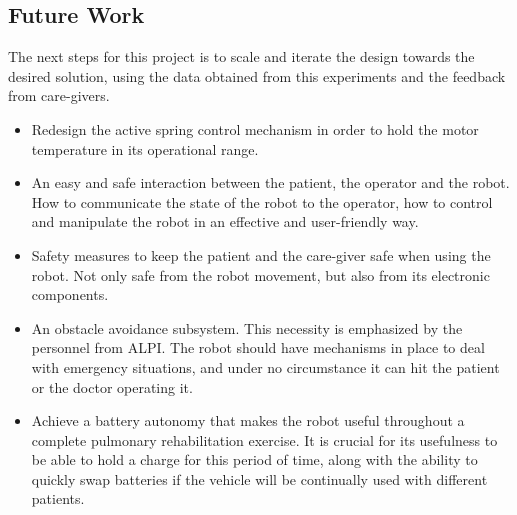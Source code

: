 \documentclass[journal]{IEEEtran}
\begin{document}
\subsection{Future Work}

The next steps for this project is to scale and iterate the design towards the desired solution, using the data obtained from this experiments and the feedback from care-givers.

\begin{itemize}
    \item Redesign the active spring control mechanism in order to hold the motor temperature in its operational range.
    \item An easy and safe interaction between the patient, the operator and the robot. How to communicate the state of the robot to the operator, how to control and manipulate the robot in an effective and user-friendly way.
    \item Safety measures to keep the patient and the care-giver safe when using the robot. Not only safe from the robot movement, but also from its electronic components.
    \item An obstacle avoidance subsystem. This necessity is emphasized by the personnel from ALPI. The robot should have mechanisms in place to deal with emergency situations, and under no circumstance it can hit the patient or the doctor operating it.
    \item Achieve a battery autonomy that makes the robot useful throughout a complete pulmonary rehabilitation exercise. It is crucial for its usefulness to be able to hold a charge for this period of time, along with the ability to quickly swap batteries if the vehicle will be continually used with different patients.
\end{itemize}{}


\end{document}
